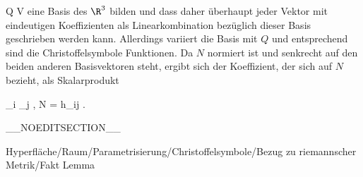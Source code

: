 \mavergleichskette
{\vergleichskette
{ Q
}
{ \in }{ V
}
{  }{
}
{    }{
}
{   }{
}
}
{}{}{}
eine Basis des $\R^3$ bilden und dass daher überhaupt jeder Vektor mit eindeutigen Koeffizienten als Linearkombination bezüglich dieser Basis geschrieben werden kann. Allerdings variiert die Basis mit $Q$ und entsprechend sind die Christoffelsymbole Funktionen. Da  $N$ normiert ist und senkrecht auf den beiden anderen Basisvektoren steht, ergibt sich der Koeffizient, der sich auf $N$ bezieht, als Skalarprodukt

\mavergleichskette
{\vergleichskette
{ \left\langle  \partial_i \partial_j \varphi , N  \right\rangle
}
{ = }{ h_{ij}
}
{  }{
}
{    }{
}
{   }{
}
}
{}{}{.}

__NOEDITSECTION__

{Hyperfläche/Raum/Parametrisierung/Christoffelsymbole/Bezug zu riemannscher Metrik/Fakt}
{Lemma}
{}
{

\faktzusatz {}

}
